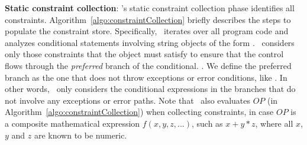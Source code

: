 \begin{mylist}

 \item \textbf{Static constraint collection}: \tool's static constraint
collection phase identifies all constraints. 
Algorithm~\ref{algo:constraintCollection} briefly describes the steps to
populate the constraint store.
Specifically, \tool\ iterates over all program code and analyzes conditional
statements involving string objects of the form .
\tool\ considers only those constraints that the object must satisfy to ensure
that the control flows through the \textit{preferred} branch of the conditional.
.
We define the preferred branch as the one that does not throw exceptions or error conditions, like . In other words, \tool\ only
considers the conditional expressions in the branches that do not involve any
exceptions or error paths. Note that \tool\ also evaluates $OP$ (in
Algorithm~\ref{algo:constraintCollection}) when collecting constraints, in case
$OP$ is a composite mathematical expression $f(x,y,z,...)$, such as $x + y * z$,
where all $x$, $y$ and $z$ are known to be numeric.

\begin{algorithm}[t]
\scriptsize
\DontPrintSemicolon
{}
\end{algorithm}
\end{mylist}
